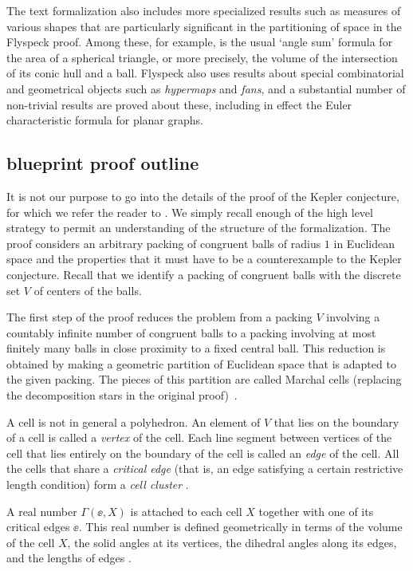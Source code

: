 The text formalization also includes more specialized results such as
measures of various shapes that are particularly significant in the
partitioning of space in the Flyspeck proof. Among these, for example,
is the usual `angle sum' formula for the area of a spherical triangle,
or more precisely, the volume of the intersection of its conic hull
and a ball. Flyspeck also uses results about special combinatorial and
geometrical objects such as {\em hypermaps} and {\em fans}, and a
substantial number of non-trivial results are proved about these,
including in effect the Euler characteristic formula for planar
graphs.

\subsection{blueprint proof outline}

It is not our purpose to go into the details of the proof of the
Kepler conjecture, for which we refer the reader to \cite{DSP}.  We
simply recall enough of the high level strategy to permit an
understanding of the structure of the formalization.  The proof
considers an arbitrary packing of congruent balls of radius $1$ in
Euclidean space and the properties that it must have to be a
counterexample to the Kepler conjecture.  Recall that we identify a
packing of congruent balls with the discrete set $V$ of centers of the
balls.

The first step of the proof reduces the problem from a packing $V$
involving a countably infinite number of congruent balls to a packing
involving at most finitely many balls in close proximity to a
 fixed central ball.  This reduction is obtained by making a
geometric partition of Euclidean space that is adapted to the given
packing.  The pieces of this partition are called Marchal cells
(replacing the decomposition stars in the original
proof)~\cite{Marchal11}.  

A cell is not in general a polyhedron.  An element of $V$ that lies on
the boundary of a cell is called a {\it vertex} of the cell.  Each
line segment between vertices of the cell that lies entirely on the
boundary of the cell is called an {\it edge} of the cell.  All the
cells that share a {\it critical edge} (that is, an edge satisfying
a certain restrictive length condition) form a {\it cell cluster}
\cite[Def. 6.89]{DSP}.

A real number $\Gamma(\ee,X)$ is attached to each cell $X$ together with
one of its critical edges $\ee$.  This real number is defined
geometrically in terms of the volume of the cell $X$, the solid angles
at its vertices, the dihedral angles along its edges, and the lengths
of edges \cite[Defs.~6.79, 6.91]{DSP}.


